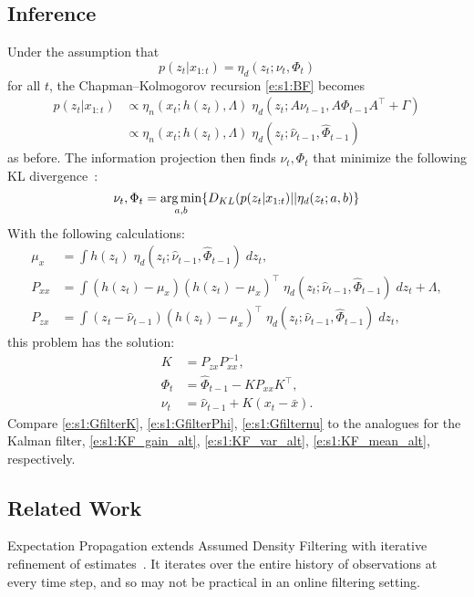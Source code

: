 \subsection{Inference}
Under the assumption that
\begin{equation}
p(z_t|x_{1:t}) = \eta_d(z_t; \nu_t, \Phi_t)
\end{equation}
for all $t$, the Chapman--Kolmogorov recursion \eqref{e:s1:BF} becomes
\begin{align}
p(z_t|x_{1:t})
& \propto \eta_n(x_t; h(z_t),\Lambda)\; \eta_d(z_t;A\nu_{t-1},A\Phi_{t-1}A^\intercal + \Gamma) \\
& \propto \eta_n(x_t; h(z_t),\Lambda)\; \eta_d(z_t;\hat\nu_{t-1},\hat\Phi_{t-1})
\end{align}
as before.  The information projection then finds $\nu_t,\Phi_t$ that minimize the following KL divergence~\cite{Cov06,Mur12}:
\begin{equation}
\nu_t, \Phi_t = \operatorname*{\arg\min}_{a,b} \{D_{KL}(p(z_t|x_{1:t}) || \eta_d(z_t; a,b)\}
\end{equation}
With the following calculations:
\begin{align}
\mu_x &= \int h(z_t)\; \eta_d(z_t;\hat\nu_{t-1},\hat\Phi_{t-1})\; dz_t \label{e:s1:adf:mux},\\
P_{xx} &= \int (h(z_t)-\mu_x) (h(z_t)-\mu_x)^\intercal \; \eta_d(z_t;\hat\nu_{t-1},\hat\Phi_{t-1})\; dz_t + \Lambda \label{e:s1:adf:pxx}, \\
P_{zx} &= \int (z_t-\hat\nu_{t-1}) (h(z_t)-\mu_x)^\intercal \; \eta_d(z_t;\hat\nu_{t-1},\hat\Phi_{t-1})\; dz_t \label{e:s1:adf:pzx},
\end{align}
this problem has the solution:
\begin{align}
K &= P_{zx}P_{xx}^{-1}, \label{e:s1:GfilterK}\\
\Phi_t &= \hat\Phi_{t-1} - KP_{xx}K^\intercal \label{e:s1:GfilterPhi}, \\
\nu_t &= \hat\nu_{t-1} + K(x_t - \bar x) \label{e:s1:Gfilternu}.
\end{align}
Compare \eqref{e:s1:GfilterK}, \eqref{e:s1:GfilterPhi}, \eqref{e:s1:Gfilternu} to the analogues for the Kalman filter, \eqref{e:s1:KF_gain_alt}, \eqref{e:s1:KF_var_alt}, \eqref{e:s1:KF_mean_alt}, respectively.

\subsection{Related Work}
Expectation Propagation extends Assumed Density Filtering with iterative refinement of estimates~\cite{Min01,Min01b}.  It iterates over the entire history of observations at every time step, and so may not be practical in an online filtering setting.

